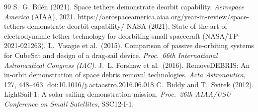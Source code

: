 \documentclass[11pt,a4paper]{article}
\begin{document}
\begin{thebibliography}{99}
 S.~G. Bil\'en (2021). Space tethers demonstrate deorbit capability. \emph{Aerospace America} (AIAA), 2021. https://aerospaceamerica.aiaa.org/year-in-review/space-tethers-demonstrate-deorbit-capability/
 NASA (2021). State-of-the-art of electrodynamic tether technology for deorbiting small spacecraft (NASA/TP-2021-021263).
 L.~Visagie et al.\ (2015). Comparison of passive de-orbiting systems for CubeSat and design of a drag-sail device. \emph{Proc.\ 66th International Astronautical Congress (IAC)}.
 J.~L. Forshaw et al.\ (2016). RemoveDEBRIS: An in-orbit demonstration of space debris removal technologies. \emph{Acta Astronautica}, 127, 448--463. doi:10.1016/j.actaastro.2016.06.018
 C.~Biddy and T.~Svitek (2012). LightSail-1: A solar sailing demonstration mission. \emph{Proc.\ 26th AIAA/USU Conference on Small Satellites}, SSC12-I-1.
\end{thebibliography}
\end{document}
